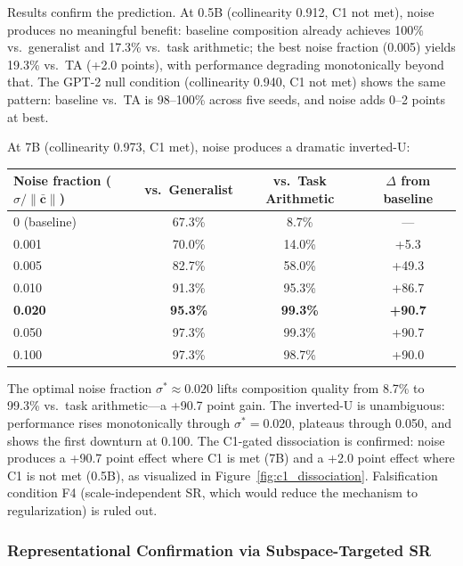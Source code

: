 \documentclass[12pt,letterpaper]{article}
\theoremstyle{definition}
\theoremstyle{remark}
\begin{document}
Results confirm the prediction. At 0.5B (collinearity 0.912, C1 not met), noise produces no meaningful benefit: baseline composition already achieves 100\% vs.\ generalist and 17.3\% vs.\ task arithmetic; the best noise fraction (0.005) yields 19.3\% vs.\ TA (+2.0 points), with performance degrading monotonically beyond that. The GPT-2 null condition (collinearity 0.940, C1 not met) shows the same pattern: baseline vs.\ TA is 98--100\% across five seeds, and noise adds 0--2 points at best.

At 7B (collinearity 0.973, C1 met), noise produces a dramatic inverted-U:

\begin{center}
\begin{tabular}{lccc}
\toprule
Noise fraction ($\sigma/\|\bar{\mathbf{c}}\|$) & vs.\ Generalist & vs.\ Task Arithmetic & $\Delta$ from baseline \\
\midrule
0 (baseline) & 67.3\% & 8.7\% & --- \\
0.001 & 70.0\% & 14.0\% & +5.3 \\
0.005 & 82.7\% & 58.0\% & +49.3 \\
0.010 & 91.3\% & 95.3\% & +86.7 \\
\textbf{0.020} & \textbf{95.3\%} & \textbf{99.3\%} & \textbf{+90.7} \\
0.050 & 97.3\% & 99.3\% & +90.7 \\
0.100 & 97.3\% & 98.7\% & +90.0 \\
\bottomrule
\end{tabular}
\end{center}

The optimal noise fraction $\sigma^* \approx 0.020$ lifts composition quality from 8.7\% to 99.3\% vs.\ task arithmetic---a +90.7 point gain. The inverted-U is unambiguous: performance rises monotonically through $\sigma^* = 0.020$, plateaus through 0.050, and shows the first downturn at 0.100. The C1-gated dissociation is confirmed: noise produces a +90.7 point effect where C1 is met (7B) and a +2.0 point effect where C1 is not met (0.5B), as visualized in Figure~\ref{fig:c1_dissociation}. Falsification condition F4 (scale-independent SR, which would reduce the mechanism to regularization) is ruled out.

\subsubsection{Representational Confirmation via Subspace-Targeted SR}
\end{document}
